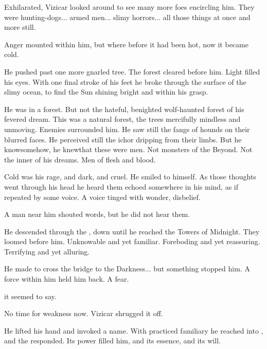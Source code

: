 Exhilarated, Vizicar looked around to see many more foes encircling him. They were hunting-dogs... armed men... slimy horrors... all those things at once and more still.

Anger mounted within him, but where before it had been hot, now it became cold. 

He pushed past one more gnarled tree. The forest cleared before him. Light filled his eyes. With one final stroke of his feet he broke through the surface of the slimy ocean, to find the Sun shining bright and within his grasp. 

He was in a forest. But not the hateful, benighted wolf-haunted forest of his fevered dream. This was a natural forest, the trees mercifully mindless and unmoving. Enemies surrounded him. He saw still the fangs of hounds on their blurred faces. He perceived still the ichor dripping from their limbs. But he know\dash somehow, he knew\dash that these were men. Not monsters of the Beyond. Not the inner \daemons{} of his dreams. Men of flesh and blood.  

Cold was his rage, and dark, and cruel. He smiled to himself. 
As those thoughts went through his head he heard them echoed somewhere in his mind, as if repeated by some voice. A voice tinged with wonder, disbelief. 

A man near him shouted words, but he did not hear them. 

He descended through the \empyrean, down until he reached the Towers of Midnight. 
They loomed before him. 
Unknowable and yet familiar. 
Foreboding and yet reassuring. 
Terrifying and yet alluring. 


He made to cross the bridge to the Darkness... but something stopped him. 
A force within him held him back. 
A fear.

 it seemed to say. 

No time for weakness now. 
Vizicar shrugged it off. 

He lifted his hand and invoked a name. 
\ta{\Nyxachel!} 
With practiced familiary he reached into \Itzach{}, and the \Qliphah{} responded. Its power filled him, and its essence, and its will. 

